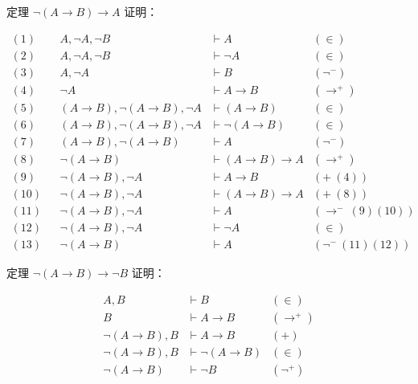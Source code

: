 \documentclass[UTF8]{ctexart}
\begin{document}
    定理 $\lnot (A \to B) \to A$ 证明：

    \begin{align*}
        (1) && A, \lnot A, \lnot B & \vdash A & (\in) \\
        (2) && A, \lnot A, \lnot B & \vdash \lnot A & (\in) \\
        (3) && A, \lnot A & \vdash B & (\lnot^{-}) \\
        (4) && \lnot A & \vdash A \to B & (\to^{+}) \\
        (5) && (A \to B), \lnot (A \to B), \lnot A & \vdash (A \to B) & (\in) \\
        (6) && (A \to B), \lnot (A \to B), \lnot A & \vdash \lnot (A \to B) & (\in) \\
        (7) && (A \to B), \lnot (A \to B) & \vdash A & (\lnot^{-}) \\
        (8) && \lnot (A \to B) & \vdash (A \to B) \to A & (\to^{+}) \\
        (9) && \lnot (A \to B), \lnot A & \vdash A \to B & (+\ (4)) \\
        (10) && \lnot (A \to B), \lnot A & \vdash (A \to B) \to A & (+\ (8)) \\
        (11) && \lnot (A \to B), \lnot A & \vdash A & (\to^{-}\ (9)(10)) \\
        (12) && \lnot (A \to B), \lnot A & \vdash \lnot A & (\in) \\
        (13) && \lnot (A \to B) & \vdash A & (\lnot^{-}\ (11)(12))
    \end{align*}

    定理 $\lnot (A \to B) \to \lnot B$ 证明：

     \begin{align*}
        A, B & \vdash B & (\in) \\
        B & \vdash A \to B & (\to^{+}) \\
        \lnot (A \to B), B & \vdash A \to B & (+) \\
        \lnot (A \to B), B & \vdash \lnot (A \to B) & (\in) \\
        \lnot (A \to B) & \vdash \lnot B & (\lnot^{+})
    \end{align*}

    \newpage
\end{document}
